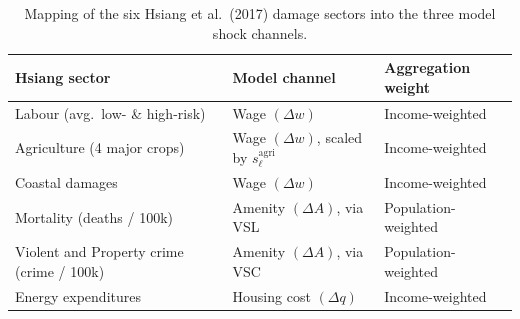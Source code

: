 \begin{table}[!htb]
\centering
\small
\renewcommand{\arraystretch}{1.2}
\begin{tabular}{lll}
\toprule
\textbf{Hsiang sector} & \textbf{Model channel} & \textbf{Aggregation weight} \\
\midrule
Labour (avg.\ low- \& high-risk) & Wage $(\Delta w)$ & Income-weighted \\
Agriculture (4 major crops) & Wage $(\Delta w)$, scaled by $s_\ell^{\text{agri}}$ & Income-weighted \\
Coastal damages & Wage $(\Delta w)$ & Income-weighted \\
\addlinespace
Mortality (deaths / 100k) & Amenity $(\Delta A)$, via VSL & Population-weighted \\
\addlinespace 
Violent and Property crime (crime / 100k) & Amenity $(\Delta A)$, via VSC & Population-weighted \\
Energy expenditures & Housing cost $(\Delta q)$ & Income-weighted \\
\bottomrule
\end{tabular}
\caption{Mapping of the six Hsiang et al.\ (2017) damage sectors into the three model shock channels.}
\label{tab:sector_mapping}
\end{table}